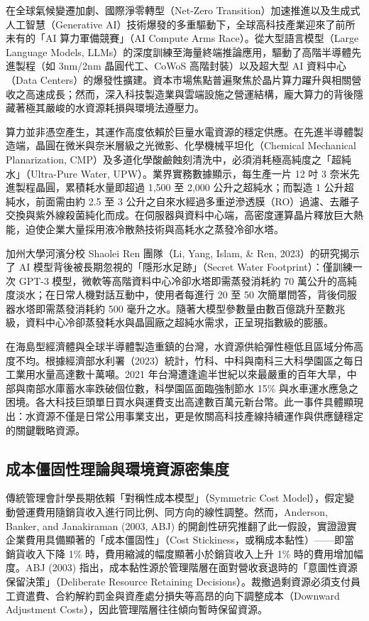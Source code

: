 \documentclass[12pt,a4paper]{article}
\begin{document}
在全球氣候變遷加劇、國際淨零轉型（Net-Zero Transition）加速推進以及生成式人工智慧（Generative AI）技術爆發的多重驅動下，全球高科技產業迎來了前所未有的「AI 算力軍備競賽」（AI Compute Arms Race）。從大型語言模型（Large Language Models, LLMs）的深度訓練至海量終端推論應用，驅動了高階半導體先進製程（如 3nm/2nm 晶圓代工、CoWoS 高階封裝）以及超大型 AI 資料中心（Data Centers）的爆發性擴建。資本市場焦點普遍聚焦於晶片算力躍升與相關營收之高速成長；然而，深入科技製造業與雲端設施之營運結構，龐大算力的背後隱藏著極其嚴峻的水資源耗損與環境法遵壓力。

算力並非憑空產生，其運作高度依賴於巨量水電資源的穩定供應。在先進半導體製造端，晶圓在微米與奈米層級之光微影、化學機械平坦化（Chemical Mechanical Planarization, CMP）及多道化學酸鹼蝕刻清洗中，必須消耗極高純度之「超純水」（Ultra-Pure Water, UPW）。業界實務數據顯示，每生產一片 12 吋 3 奈米先進製程晶圓，累積耗水量即超過 1,500 至 2,000 公升之超純水；而製造 1 公升超純水，前面需由約 2.5 至 3 公升之自來水經過多重逆滲透膜（RO）過濾、去離子交換與紫外線殺菌純化而成。在伺服器與資料中心端，高密度運算晶片釋放巨大熱能，迫使企業大量採用液冷散熱技術與高耗水之蒸發冷卻水塔。

加州大學河濱分校 Shaolei Ren 團隊（Li, Yang, Islam, \& Ren, 2023）的研究揭示了 AI 模型背後被長期忽視的「隱形水足跡」（Secret Water Footprint）：僅訓練一次 GPT-3 模型，微軟等高階資料中心冷卻水塔即需蒸發消耗約 70 萬公升的高純度淡水；在日常人機對話互動中，使用者每進行 20 至 50 次簡單問答，背後伺服器水塔即需蒸發消耗約 500 毫升之水。隨著大模型參數量由數百億跳升至數兆級，資料中心冷卻蒸發耗水與晶圓廠之超純水需求，正呈現指數級的膨脹。

在海島型經濟體與全球半導體製造重鎮的台灣，水資源供給彈性極低且區域分佈高度不均。根據經濟部水利署（2023）統計，竹科、中科與南科三大科學園區之每日工業用水量高達數十萬噸。2021 年台灣遭逢逾半世紀以來最嚴重的百年大旱，中部與南部水庫蓄水率跌破個位數，科學園區面臨強制節水 15\% 與水車運水應急之困境。各大科技巨頭單日買水與運費支出高達數百萬元新台幣。此一事件具體顯現出：水資源不僅是日常公用事業支出，更是攸關高科技產線持續運作與供應鏈穩定的關鍵戰略資源。

\subsection{成本僵固性理論與環境資源密集度}

傳統管理會計學長期依賴「對稱性成本模型」（Symmetric Cost Model），假定變動營運費用隨銷貨收入進行同比例、同方向的線性調整。然而，Anderson, Banker, and Janakiraman (2003, ABJ) 的開創性研究推翻了此一假設，實證證實企業費用具備顯著的「成本僵固性」（Cost Stickiness，或稱成本黏性）——即當銷貨收入下降 1\% 時，費用縮減的幅度顯著小於銷貨收入上升 1\% 時的費用增加幅度。ABJ (2003) 指出，成本黏性源於管理階層在面對營收衰退時的「意圖性資源保留決策」（Deliberate Resource Retaining Decisions）。裁撤過剩資源必須支付員工資遣費、合約解約罰金與資產處分損失等高昂的向下調整成本（Downward Adjustment Costs），因此管理階層往往傾向暫時保留資源。
\end{document}
